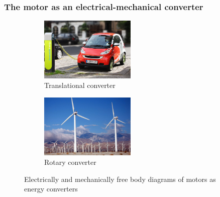 \begin{frame}
	\frametitle{The motor as an electrical-mechanical converter}
	\begin{figure}
		\centering
		\begin{subfigure}[b]{0.49\textwidth}
			\centering
			\includegraphics[width=0.5\textwidth]{fig/lec01/Electric_Car_recharging.jpg}
			\caption{Translational converter}
		\end{subfigure}
		\hfill
		\begin{subfigure}[b]{0.49\textwidth}
			\centering
			\includegraphics[width=0.5\textwidth]{fig/lec01/sky-farm-windmill.jpg}
			\caption{Rotary converter}
		\end{subfigure}
		\caption{Electrically and mechanically free body diagrams of motors as energy converters} 
        \label{fig:free_body_diagrams_motor}
	\end{figure}
\end{frame}


